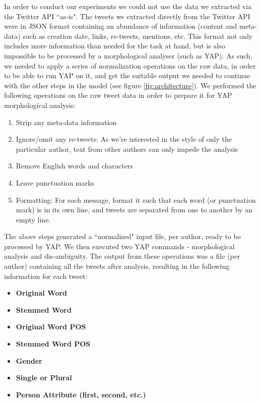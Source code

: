 \documentclass[a4paper]{article}
\begin{document}
In order to conduct our experiments we could not use the data we extracted via the Twitter API ``as-is". The tweets we extracted directly from the Twitter API were in JSON format containing an abundance of information (content and meta-data) such as creation date, links, re-tweets, mentions, etc. This format not only includes more information than needed for the task at hand, but is also impossible to be processed by a morphological analyser (such as YAP). As such, we needed to apply a series of normalization operations on the raw data, in order to be able to run YAP on it, and get the suitable output we needed to continue with the other steps in the model (see figure \ref{fig:architecture}).
We performed the following operations on the raw tweet data in order to prepare it for YAP morphological analysis:\\
\begin{enumerate}
	\item Strip any meta-data information
	\item Ignore/omit any re-tweets: As we're interested in the style of only the particular author, text from other authors can only impede the analysis
	\item Remove English words and characters
	\item Leave punctuation marks
	\item Formatting: For each message, format it such that each word (or punctuation mark) is in its own line, and tweets are separated from one to another by an empty line.
\end{enumerate}
The above steps generated a ``normalized" input file, per author, ready to be processed by YAP. We then executed two YAP commands - morphological analysis and dis-ambiguity. The output from these operations was a file (per author) containing all the tweets after analysis, resulting in the following information for each tweet:\\
\begin{itemize}
\item \textbf{Original Word}
\item \textbf{Stemmed Word}
\item \textbf{Original Word POS}
\item \textbf{Stemmed Word POS}
\item \textbf{Gender}
\item \textbf{Single or Plural}
\item \textbf{Person Attribute (first, second, etc.)}
\end{itemize}
\end{document}
